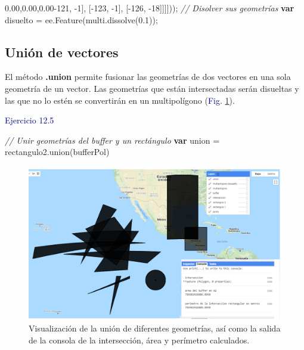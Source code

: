 \documentclass[
  12pt,
  letterpaper,
  twoside]{book}
\newenvironment{Shaded}{\begin{snugshade}}{\end{snugshade}}
\newcommand{\CommentTok}[1]{\textcolor[rgb]{0.24,0.58,0.00}{\textit{#1}}}
\newcommand{\ControlFlowTok}[1]{\textcolor[rgb]{0.00,0.00,0.00}{\textbf{#1}}}
\newcommand{\DecValTok}[1]{\textcolor[rgb]{0.28,0.53,0.93}{#1}}
\newcommand{\FloatTok}[1]{\textcolor[rgb]{0.28,0.53,0.93}{#1}}
\newcommand{\FunctionTok}[1]{\textcolor[rgb]{0.48,0.12,0.64}{#1}}
\newcommand{\KeywordTok}[1]{\textcolor[rgb]{0.48,0.12,0.64}{#1}}
\newcommand{\NormalTok}[1]{#1}
\newcommand{\OperatorTok}[1]{\textcolor[rgb]{0.00,0.00,0.00}{#1}}
\newcommand\boldpurple[1]{\textcolor{darkpurple}{\textbf{#1}}}
\begin{document}
\begin{Shaded}
\begin{Highlighting}[]
\NormalTok{             [[[}\OperatorTok{{-}}\DecValTok{121}\OperatorTok{,} \OperatorTok{{-}}\DecValTok{1}\NormalTok{]}\OperatorTok{,}\NormalTok{ [}\OperatorTok{{-}}\DecValTok{123}\OperatorTok{,} \OperatorTok{{-}}\DecValTok{1}\NormalTok{]}\OperatorTok{,}\NormalTok{ [}\OperatorTok{{-}}\DecValTok{126}\OperatorTok{,} \OperatorTok{{-}}\DecValTok{18}\NormalTok{]]]]))}\OperatorTok{;}
\CommentTok{// Disolver sus geometrías}
\ControlFlowTok{var}\NormalTok{ disuelto }\OperatorTok{=} \KeywordTok{ee}\OperatorTok{.}\FunctionTok{Feature}\NormalTok{(multi}\OperatorTok{.}\FunctionTok{dissolve}\NormalTok{(}\FloatTok{0.1}\NormalTok{))}\OperatorTok{;}
\end{Highlighting}
\end{Shaded}

\hypertarget{uniuxf3n-de-vectores}{%
\subsection*{Unión de vectores}\label{uniuxf3n-de-vectores}}

El método \boldpurple{.union} permite fusionar las geometrías de dos vectores en una sola geometría de un vector. Las geometrías que están intersectadas serán disueltas y las que no lo estén se convertirán en un multipolígono (\textcolor{darkblue}{Fig.} \ref{fig:f73}).

\textcolor{darkblue}{Ejercicio 12.5}

\begin{Shaded}
\begin{Highlighting}[]
\CommentTok{// Unir geometrías del buffer y un rectángulo }
\ControlFlowTok{var}\NormalTok{ union }\OperatorTok{=}\NormalTok{ rectangulo2}\OperatorTok{.}\FunctionTok{union}\NormalTok{(bufferPol)}
\end{Highlighting}
\end{Shaded}

\begin{figure}[H]

{\centering \includegraphics[width=0.95\linewidth]{Img/ej12} 

}

\caption{Visualización de la unión de diferentes geometrías, así como la salida de la consola de la intersección, área y perímetro calculados.}\label{fig:f73}
\end{figure}
\end{document}
